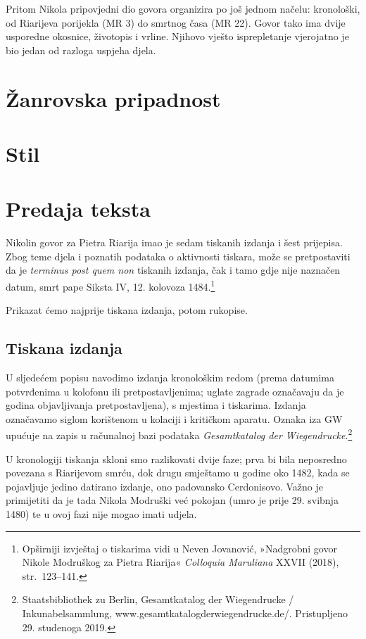 \documentclass[a5paper,twoside]{article}
\begin{document}
Pritom Nikola pripovjedni dio govora organizira po još jednom načelu: kronološki, od Riarijeva porijekla (MR 3) do smrtnog časa (MR 22). Govor tako ima dvije usporedne okosnice, životopis i vrline. Njihovo vješto isprepletanje vjerojatno je bio jedan od razloga uspjeha djela.

\section{Žanrovska pripadnost}

\section{Stil}

\section{Predaja teksta}

Nikolin govor za Pietra Riarija imao je sedam tiskanih izdanja i šest prijepisa.  Zbog teme djela i poznatih podataka o aktivnosti tiskara, može se pretpostaviti da je \textit{terminus post quem non} tiskanih izdanja, čak i tamo gdje nije naznačen datum, smrt pape Siksta IV, 12. kolovoza 1484.\footnote{Opširniji izvještaj o tiskarima vidi u Neven Jovanović, »Nadgrobni govor Nikole Modruškog za Pietra Riarija« \textit{Colloquia Maruliana} XXVII (2018), str.~123–141.}

Prikazat ćemo najprije tiskana izdanja, potom rukopise.

\subsection{Tiskana izdanja}

U sljedećem popisu navodimo izdanja kronološkim redom (prema datumima potvrđenima u kolofonu ili pretpostavljenima; uglate zagrade označavaju da je godina objavljivanja pretpostavljena), s mjestima i tiskarima. Izdanja označavamo siglom korištenom u kolaciji i kritičkom aparatu. Oznaka iza GW upućuje na zapis u računalnoj bazi podataka \textit{Gesamtkatalog der Wiegendrucke}.\footnote{Staatsbibliothek zu Berlin, Gesamtkatalog der Wiegendrucke / Inkunabelsammlung, www.gesamtkatalogderwiegendrucke.de/. Pristupljeno 29. studenoga 2019.} 

U kronologiji tiskanja skloni smo razlikovati dvije faze; prva bi bila neposredno povezana s Riarijevom smrću, dok drugu smještamo u godine oko 1482, kada se pojavljuje jedino datirano izdanje, ono padovansko Cerdonisovo. Važno je primijetiti da je tada Nikola Modruški već pokojan (umro je prije 29. svibnja 1480) te u ovoj fazi nije mogao imati udjela.
\end{document}

